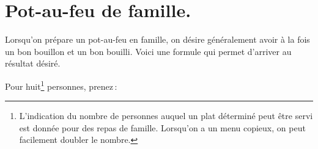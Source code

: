 \section*{\centering Pot-au-feu de famille.}

\justify

\setlength\tabcolsep{.3em}

\label{pg0199} \hypertarget{p0199}{}
Lorsqu'on prépare un pot-au-feu en famille, on désire généralement avoir à la
fois un bon bouillon et un bon bouilli. Voici une formule qui permet d'arriver
au résultat désiré.

\smallskip

Pour huit\footnote{L'indication du nombre de personnes auquel un plat déterminé
peut être servi est donnée pour des repas de famille. Lorsqu'on a un menu
copieux, on peut facilement doubler le nombre.} personnes, prenez :

